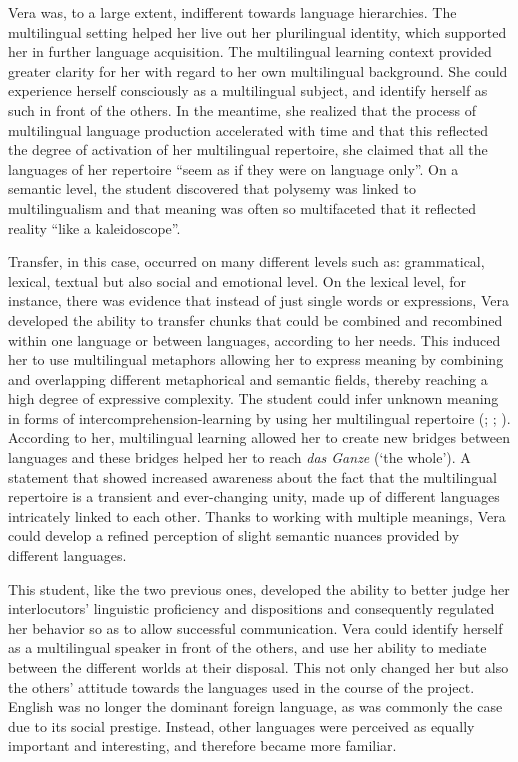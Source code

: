 \documentclass[output=paper]{../langscibook}
\begin{document}
Vera was, to a large extent, indifferent towards language hierarchies. The multilingual setting helped her live out her plurilingual identity, which supported her in further language acquisition.  The multilingual learning context provided greater clarity for her with regard to her own multilingual background. She could experience herself consciously as a multilingual subject, and identify herself as such in front of the others. In the meantime, she realized that the process of multilingual language production accelerated with time and that this reflected the degree of activation of her multilingual repertoire, she claimed that all the languages of her repertoire “seem as if they were on language only”. On a semantic level, the student discovered that polysemy was linked to multilingualism and that meaning was often so multifaceted that it reflected reality “like a kaleidoscope”. 

Transfer, in this case, occurred on many different levels such as: grammatical, lexical, textual but also social and emotional level. On the lexical level, for instance, there was evidence that instead of just single words or expressions, Vera developed the ability to transfer chunks that could be combined and recombined within one language or between languages, according to her needs. This induced her to use multilingual metaphors allowing her to express meaning by combining and overlapping different metaphorical and semantic fields, thereby reaching a high degree of expressive complexity. The student could infer unknown meaning in forms of intercomprehension-learning by using her multilingual repertoire (\citealt{HufeisenNeuner2004}; \citealt{MeisnerSchocker2005}; \citealt{MeisnerEtAl2009}). According to her, multilingual learning allowed her to create new bridges between languages and these bridges helped her to reach \emph{das Ganze} (`the whole'). A statement that showed increased awareness about the fact that the multilingual repertoire is a transient and ever-changing unity, made up of different languages intricately linked to each other. Thanks to working with multiple meanings, Vera could develop a refined perception of slight semantic nuances provided by different languages. 

This student, like the two previous ones, developed the ability to better judge her interlocutors’ linguistic proficiency and dispositions and consequently regulated her behavior so as to allow successful communication. Vera could identify herself as a multilingual speaker in front of the others, and use her ability to mediate between the different worlds at their disposal. This not only changed her but also the others’ attitude towards the languages used in the course of the project. English was no longer the dominant foreign language, as was commonly the case due to its social prestige. Instead, other languages were perceived as equally important and interesting, and therefore became more familiar. 
\end{document}
